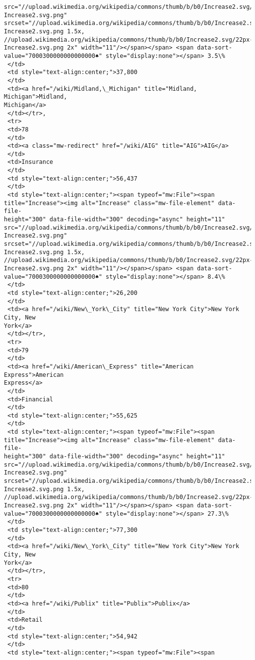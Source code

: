 \documentclass[11pt]{article}
\begin{document}
\begin{tcolorbox}[breakable, size=fbox, boxrule=.5pt, pad at break*=1mm, opacityfill=0]
\begin{Verbatim}[commandchars=\\\{\}]
src="//upload.wikimedia.org/wikipedia/commons/thumb/b/b0/Increase2.svg/11px-
Increase2.svg.png"
srcset="//upload.wikimedia.org/wikipedia/commons/thumb/b/b0/Increase2.svg/17px-
Increase2.svg.png 1.5x,
//upload.wikimedia.org/wikipedia/commons/thumb/b/b0/Increase2.svg/22px-
Increase2.svg.png 2x" width="11"/></span></span> <span data-sort-
value="7000300000000000000♠" style="display:none"></span> 3.5\%
 </td>
 <td style="text-align:center;">37,800
 </td>
 <td><a href="/wiki/Midland,\_Michigan" title="Midland, Michigan">Midland,
Michigan</a>
 </td></tr>,
 <tr>
 <td>78
 </td>
 <td><a class="mw-redirect" href="/wiki/AIG" title="AIG">AIG</a>
 </td>
 <td>Insurance
 </td>
 <td style="text-align:center;">56,437
 </td>
 <td style="text-align:center;"><span typeof="mw:File"><span
title="Increase"><img alt="Increase" class="mw-file-element" data-file-
height="300" data-file-width="300" decoding="async" height="11"
src="//upload.wikimedia.org/wikipedia/commons/thumb/b/b0/Increase2.svg/11px-
Increase2.svg.png"
srcset="//upload.wikimedia.org/wikipedia/commons/thumb/b/b0/Increase2.svg/17px-
Increase2.svg.png 1.5x,
//upload.wikimedia.org/wikipedia/commons/thumb/b/b0/Increase2.svg/22px-
Increase2.svg.png 2x" width="11"/></span></span> <span data-sort-
value="7000300000000000000♠" style="display:none"></span> 8.4\%
 </td>
 <td style="text-align:center;">26,200
 </td>
 <td><a href="/wiki/New\_York\_City" title="New York City">New York City, New
York</a>
 </td></tr>,
 <tr>
 <td>79
 </td>
 <td><a href="/wiki/American\_Express" title="American Express">American
Express</a>
 </td>
 <td>Financial
 </td>
 <td style="text-align:center;">55,625
 </td>
 <td style="text-align:center;"><span typeof="mw:File"><span
title="Increase"><img alt="Increase" class="mw-file-element" data-file-
height="300" data-file-width="300" decoding="async" height="11"
src="//upload.wikimedia.org/wikipedia/commons/thumb/b/b0/Increase2.svg/11px-
Increase2.svg.png"
srcset="//upload.wikimedia.org/wikipedia/commons/thumb/b/b0/Increase2.svg/17px-
Increase2.svg.png 1.5x,
//upload.wikimedia.org/wikipedia/commons/thumb/b/b0/Increase2.svg/22px-
Increase2.svg.png 2x" width="11"/></span></span> <span data-sort-
value="7000300000000000000♠" style="display:none"></span> 27.3\%
 </td>
 <td style="text-align:center;">77,300
 </td>
 <td><a href="/wiki/New\_York\_City" title="New York City">New York City, New
York</a>
 </td></tr>,
 <tr>
 <td>80
 </td>
 <td><a href="/wiki/Publix" title="Publix">Publix</a>
 </td>
 <td>Retail
 </td>
 <td style="text-align:center;">54,942
 </td>
 <td style="text-align:center;"><span typeof="mw:File"><span

\end{Verbatim}
\end{tcolorbox}
\end{document}
